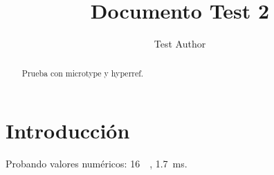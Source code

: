 \documentclass[conference,a4paper]{IEEEtran}
\begin{document}
\title{Documento Test 2}
\author{Test Author}
\maketitle

\begin{abstract}
Prueba con microtype y hyperref.
\end{abstract}

\section{Introducción}
Probando valores numéricos: \SI{16}{\giga\byte}, \SI{1.7}{\milli\second}.
\end{document}
